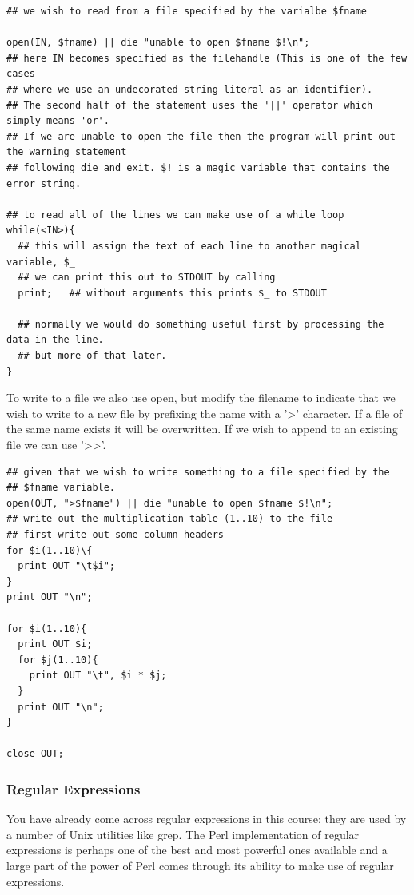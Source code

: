 \documentclass[11pt]{article}
\begin{document}
\begin{verbatim}
## we wish to read from a file specified by the varialbe $fname

open(IN, $fname) || die "unable to open $fname $!\n";
## here IN becomes specified as the filehandle (This is one of the few cases
## where we use an undecorated string literal as an identifier).
## The second half of the statement uses the '||' operator which simply means 'or'.
## If we are unable to open the file then the program will print out the warning statement
## following die and exit. $! is a magic variable that contains the error string.

## to read all of the lines we can make use of a while loop
while(<IN>){
  ## this will assign the text of each line to another magical variable, $_
  ## we can print this out to STDOUT by calling
  print;   ## without arguments this prints $_ to STDOUT

  ## normally we would do something useful first by processing the data in the line.
  ## but more of that later.
}
\end{verbatim}



To write to a file we also use open, but modify the filename to indicate
that we wish to write to a new file by prefixing the name with a '>'
character. If a file of the same name exists it will be overwritten. If
we wish to append to an existing file we can use '>>'.

\begin{verbatim}
## given that we wish to write something to a file specified by the
## $fname variable.
open(OUT, ">$fname") || die "unable to open $fname $!\n";
## write out the multiplication table (1..10) to the file
## first write out some column headers
for $i(1..10)\{
  print OUT "\t$i";
}
print OUT "\n";

for $i(1..10){
  print OUT $i;
  for $j(1..10){
    print OUT "\t", $i * $j;
  }
  print OUT "\n";
}

close OUT;
\end{verbatim}

\subsubsection{Regular Expressions}
\label{sec-9-0-6}

You have already come across regular expressions in this course; they
are used by a number of Unix utilities like grep. The Perl
implementation of regular expressions is perhaps one of the best and
most powerful ones available and a large part of the power of Perl comes
through its ability to make use of regular expressions.
\end{document}
